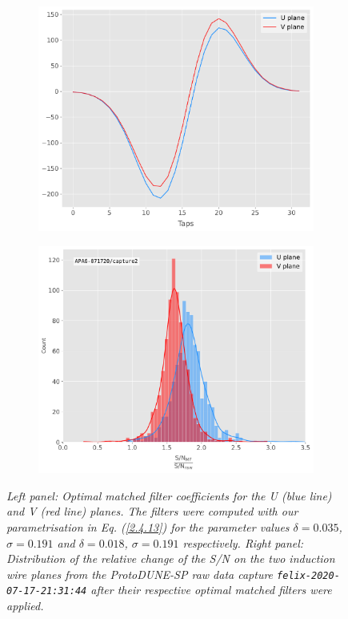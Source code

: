 \begin{figure}[t]
	\begin{subfigure}{0.5\textwidth}
		\centering
		\includegraphics[width=.99\linewidth]{Images/Matched_Filter/optimal_coeffs}
	\end{subfigure}
	\begin{subfigure}{0.5\textwidth}
		\centering
		\includegraphics[width=.99\linewidth]{Images/Matched_Filter/improvement_capture}
	\end{subfigure}
	\caption{\textit{Left panel: Optimal matched filter coefficients for the U (blue line) and V (red line) planes. The filters were computed with our parametrisation in Eq. (\ref{2.4.13}) for the parameter values $\delta = 0.035$, $\sigma = 0.191$ and $\delta = 0.018$, $\sigma = 0.191$ respectively. Right panel: Distribution of the relative change of the S/N on the two induction wire planes from the ProtoDUNE-SP raw data capture \texttt{felix-2020-07-17-21:31:44} after their respective optimal matched filters were applied.}}
	\label{fig:mf_perf}
\end{figure}

